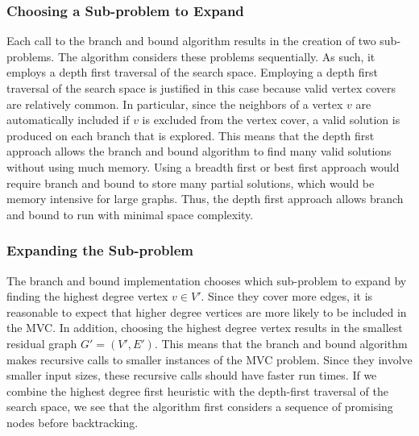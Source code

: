\documentclass{sig-alternate-05-2015}
\begin{document}
\subsubsection{Choosing a Sub-problem to Expand}
Each call to the branch and bound algorithm results in the creation of two sub-problems. The algorithm considers these problems sequentially. As such, it employs a depth first traversal of the search space. Employing a depth first traversal of the search space is justified in this case because valid vertex covers are relatively common. In particular, since the neighbors of a vertex $v$ are automatically included if $v$ is excluded from the vertex cover, a valid solution is produced on each branch that is explored. This means that the depth first approach allows the branch and bound algorithm to find many valid solutions without using much memory. Using a breadth first or best first approach would require branch and bound to store many partial solutions, which would be memory intensive for large graphs. Thus, the depth first approach allows branch and bound to run with minimal space complexity.

\subsubsection{Expanding the Sub-problem}
The branch and bound implementation chooses which sub-problem to expand by finding the highest degree vertex $v \in V'$. Since they cover more edges, it is reasonable to expect that higher degree vertices are more likely to be included in the MVC. In addition, choosing the highest degree vertex results in the smallest residual graph $G'=(V',E')$. This means that the branch and bound algorithm makes recursive calls to smaller instances of the MVC problem. Since they involve smaller input sizes, these recursive calls should have faster run times. If we combine the highest degree first heuristic with the depth-first traversal of the search space, we see that the algorithm first considers a sequence of promising nodes before backtracking.
\end{document}
